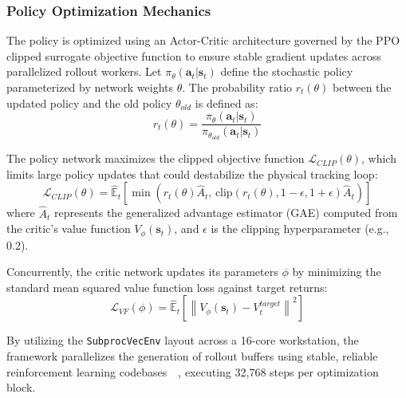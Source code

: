 \documentclass[letterpaper,11pt]{AAS}
\begin{document}
\subsubsection{Policy Optimization Mechanics}
The policy is optimized using an Actor-Critic architecture governed by the PPO clipped surrogate objective function to ensure stable gradient updates across parallelized rollout workers. Let $\pi_\theta(\mathbf{a}_t | \mathbf{s}_t)$ define the stochastic policy parameterized by network weights $\theta$. The probability ratio $r_t(\theta)$ between the updated policy and the old policy $\theta_{old}$ is defined as:
\begin{equation}
    r_t(\theta) = \frac{\pi_\theta(\mathbf{a}_t | \mathbf{s}_t)}{\pi_{\theta_{old}}(\mathbf{a}_t | \mathbf{s}_t)}
    \label{eq:probability_ratio}
\end{equation}

The policy network maximizes the clipped objective function $\mathcal{L}_{CLIP}(\theta)$, which limits large policy updates that could destabilize the physical tracking loop:
\begin{equation}
    \mathcal{L}_{CLIP}(\theta) = \hat{\mathbb{E}}_t \left[ \min\left( r_t(\theta)\hat{A}_t, \, \text{clip}\left(r_t(\theta), 1-\epsilon, 1+\epsilon\right)\hat{A}_t \right) \right]
    \label{eq:ppo_clip_objective}
\end{equation}
where $\hat{A}_t$ represents the generalized advantage estimator (GAE) computed from the critic's value function $V_\phi(\mathbf{s}_t)$, and $\epsilon$ is the clipping hyperparameter (e.g., 0.2). 

Concurrently, the critic network updates its parameters $\phi$ by minimizing the standard mean squared value function loss against target returns:
\begin{equation}
    \mathcal{L}_{VF}(\phi) = \hat{\mathbb{E}}_t \left[ \left\| V_\phi(\mathbf{s}_t) - V_t^{target} \right\|^2 \right]
    \label{eq:ppo_value_loss}
\end{equation}

By utilizing the \texttt{SubprocVecEnv} layout across a 16-core workstation, the framework parallelizes the generation of rollout buffers using stable, reliable reinforcement learning codebases~~\cite{hill_stable-baselines3_2021}, executing 32,768 steps per optimization block.

\end{document}
